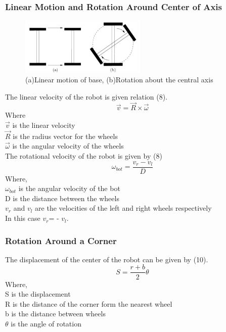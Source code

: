 \documentclass[conference]{IEEEtran}
\begin{document}
\subsubsection{Linear Motion and Rotation Around Center of Axis}
\begin{figure}[h]
\includegraphics[width=6cm]{linearandrot.png}
\centering
\caption{(a)Linear motion of base, (b)Rotation about the central axis}\label{net_img}
\end{figure}
The linear velocity of the robot is given relation (8).
\begin{equation} \label{eq:8}
\vec{v}=\vec{R}\times \vec{\omega}
\end{equation}
Where\\
$\vec{v}$ is the linear velocity\\
$\vec{R}$ is the radius vector for the wheels\\
$\vec{\omega}$ is the angular velocity of the wheels\\
The rotational velocity of the robot is given by (8)\\
\begin{equation} \label{eq:9}
\omega_{bot}=\frac{v_r-v_l}{D}
\end{equation}
Where,\\
$\omega_{bot}$ is the angular velocity of the bot\\
D is the distance between the wheels\\
$v_r$ and $v_l$ are the velocities of the left and right wheels respectively\\

In this case $v_r$= - $v_l$.
\subsubsection{Rotation Around a Corner}

The displacement of the center of the robot can be given by (10).
\begin{equation} \label{eq:10}
S=\frac{r+b}{2}\theta
\end{equation}
Where,\\
S is the displacement\\
R is the distance of the corner form the nearest wheel\\
b is the distance between wheels\\
$\theta$  is the angle of rotation\\
\end{document}
